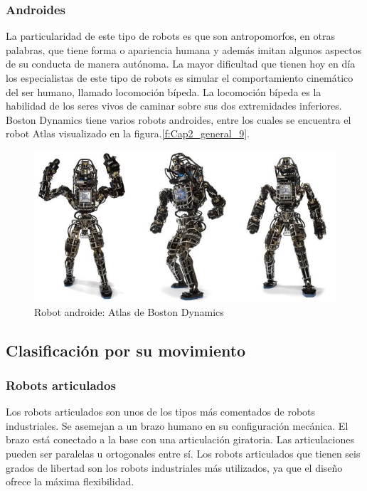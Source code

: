         \subsubsection{Androides}
        La particularidad de este tipo de robots es que son antropomorfos, en otras palabras, que tiene forma o apariencia humana y además imitan algunos aspectos de su conducta de manera autónoma. La mayor dificultad que tienen hoy en día los especialistas de este tipo de robots es simular el comportamiento cinemático del ser humano, llamado locomoción bípeda. La locomoción bípeda es la habilidad de los seres vivos de caminar sobre sus dos extremidades inferiores. Boston Dynamics tiene varios robots androides, entre los cuales se encuentra el robot Atlas visualizado en la figura.\eqref{f:Cap2_general_9}.
        
        \begin{figure}[htb]
            \centering
            \includegraphics[width=0.65\linewidth]{Main/Chapter2/Images2/Robot-androide.png}
            \caption{Robot androide: Atlas de Boston Dynamics \cite{cap2_androide}}
            \label{f:Cap2_general_9}
        \end{figure}
        
        \newpage

    
    \subsection{Clasificación por su movimiento}
    
        \subsubsection{Robots articulados}
        
        Los robots articulados son unos de los tipos más comentados de robots industriales. Se asemejan a un brazo humano en su configuración mecánica. El brazo está conectado a la base con una articulación giratoria. Las articulaciones pueden ser paralelas u ortogonales entre sí. Los robots articulados que tienen seis grados de libertad son los robots industriales más utilizados, ya que el diseño ofrece la máxima flexibilidad.
        
